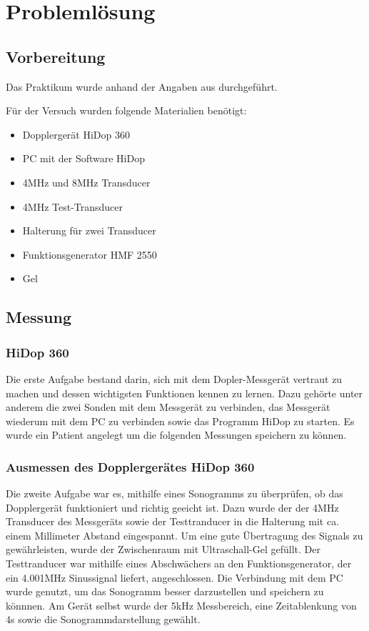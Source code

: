\documentclass[11pt]{scrartcl}
\begin{document}
    \section{Problemlösung}
    \subsection{Vorbereitung}
   Das Praktikum wurde anhand der Angaben aus \cite{Doppler} durchgeführt.
    
    Für der Versuch wurden folgende Materialien benötigt:
    \begin{itemize}
        \item Dopplergerät HiDop 360 
        \item PC mit der Software HiDop
        \item 4MHz und 8MHz Transducer
        \item 4MHz Test-Transducer 
        \item Halterung für zwei Transducer
        \item Funktionsgenerator HMF 2550 
        \item Gel
    \end{itemize}


    \subsection{Messung}
    \subsubsection{HiDop 360}
    Die erste Aufgabe bestand darin, sich mit dem Dopler-Messgerät vertraut zu machen 
    und dessen wichtigsten Funktionen kennen zu lernen.
    Dazu gehörte unter anderem die zwei Sonden mit dem Messgerät zu verbinden, das Messgerät
    wiederum mit dem PC zu verbinden sowie das Programm HiDop zu starten.
    Es wurde ein Patient angelegt um die folgenden Messungen speichern zu können.

    \subsubsection{Ausmessen des Dopplergerätes HiDop 360}
    Die zweite Aufgabe war es, mithilfe eines Sonogramms zu überprüfen, ob das Dopplergerät funktioniert und richtig geeicht ist. 
    Dazu wurde der der 4MHz Transducer des Messgeräts sowie der Testtranducer in die Halterung mit ca. einem Millimeter Abstand eingespannt.
    Um eine gute Übertragung des Signals zu gewährleisten, wurde der Zwischenraum mit Ultraschall-Gel gefüllt.
    Der Testtranducer war mithilfe eines Abschwächers an den Funktionsgenerator, der ein 4.001MHz Sinussignal liefert, angeschlossen. 
    Die Verbindung mit dem PC wurde genutzt, um das Sonogramm besser darzustellen und speichern zu könnnen.
    Am Gerät selbst wurde der 5kHz Messbereich, eine Zeitablenkung von 4s sowie die Sonogrammdarstellung gewählt.
\end{document}
